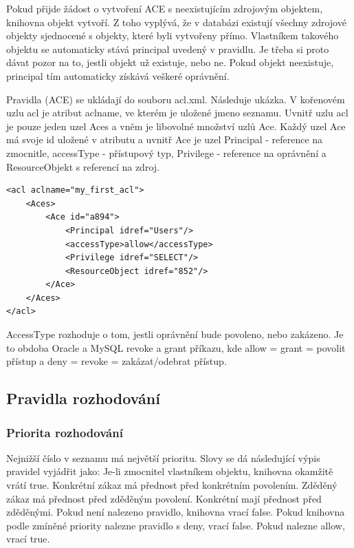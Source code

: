 Pokud přijde žádost o vytvoření ACE s neexistujícím zdrojovým objektem, knihovna objekt vytvoří. Z toho vyplývá, že v databázi existují všechny zdrojové objekty sjednocené s objekty, které byli vytvořeny přímo. Vlastníkem takového objektu se automaticky stává principal uvedený v pravidlu. Je třeba si proto dávat pozor na to, jestli objekt už existuje, nebo ne. Pokud objekt neexistuje, principal tím automaticky získává veškeré oprávnění.

Pravidla (ACE) se ukládají do souboru acl.xml. Následuje ukázka. V kořenovém uzlu acl je atribut aclname, ve kterém je uložené jmeno seznamu. Uvnitř uzlu acl je pouze jeden uzel Aces a vněm je libovolné množství uzlů Ace. Každý uzel Ace má svoje id uložené v atributu a uvnitř Ace je uzel Principal - reference na zmocnitle, accessType - přístupový typ, Privilege - reference na oprávnění a ResourceObjekt s referencí na zdroj.

\begin{lstlisting}
<acl aclname="my_first_acl">
    <Aces>
        <Ace id="a894">
            <Principal idref="Users"/>
            <accessType>allow</accessType>
            <Privilege idref="SELECT"/>
            <ResourceObject idref="852"/>
        </Ace>
    </Aces>
</acl>
\end{lstlisting}

AccessType rozhoduje o tom, jestli oprávnění bude povoleno, nebo zakázeno. Je to obdoba Oracle a MySQL revoke a grant příkazu, kde allow = grant = povolit přístup a deny = revoke = zakázat/odebrat přístup.


\subsection{Pravidla rozhodování}
\subsubsection{Priorita rozhodování}

Nejnižší číslo v seznamu má největší prioritu. Slovy se dá následující výpis pravidel vyjádřit jako: Je-li zmocnitel vlastníkem objektu, knihovna okamžitě vrátí true. Konkrétní zákaz má přednost před konkrétním povolením. Zděděný zákaz má přednost před zděděným povolení. Konkrétní mají přednost před zděděnými. Pokud není nalezeno pravidlo, knihovna vrací false. Pokud knihovna podle zmíněné priority nalezne pravidlo s deny, vrací false. Pokud nalezne allow, vrací true.

